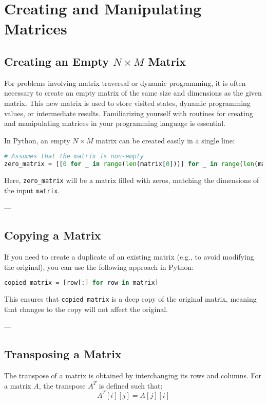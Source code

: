 \section*{Creating and Manipulating Matrices}

\subsection*{Creating an Empty \(N \times M\) Matrix}
For problems involving matrix traversal or dynamic programming, it is often necessary to create an empty matrix of the same size and dimensions as the given matrix. This new matrix is used to store visited states, dynamic programming values, or intermediate results. Familiarizing yourself with routines for creating and manipulating matrices in your programming language is essential.

In Python, an empty \(N \times M\) matrix can be created easily in a single line:

\begin{lstlisting}[language=Python]
# Assumes that the matrix is non-empty
zero_matrix = [[0 for _ in range(len(matrix[0]))] for _ in range(len(matrix))]
\end{lstlisting}

Here, \texttt{zero\_matrix} will be a matrix filled with zeros, matching the dimensions of the input \texttt{matrix}.

---

\subsection*{Copying a Matrix}
If you need to create a duplicate of an existing matrix (e.g., to avoid modifying the original), you can use the following approach in Python:

\begin{lstlisting}[language=Python]
copied_matrix = [row[:] for row in matrix]
\end{lstlisting}

This ensures that \texttt{copied\_matrix} is a deep copy of the original matrix, meaning that changes to the copy will not affect the original.

---

\subsection*{Transposing a Matrix}
The transpose of a matrix is obtained by interchanging its rows and columns. For a matrix \(A\), the transpose \(A^T\) is defined such that:
\[
A^T[i][j] = A[j][i]
\]

